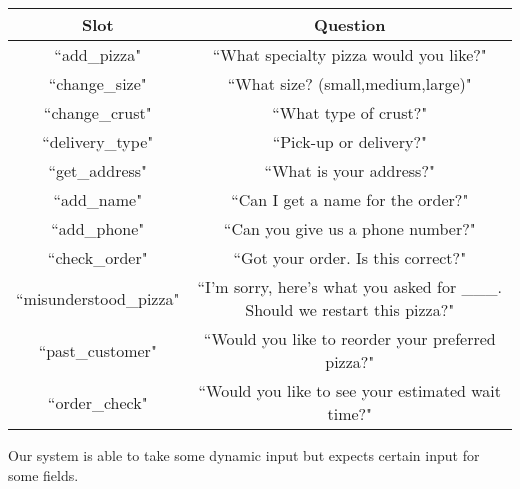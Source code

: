 \documentclass{article}
\begin{document}
\begin{tabular}{|c|c|}
\hline
Slot & Question \\\hline
``add\_pizza" & ``What specialty pizza would you like?"\\\hline
``change\_size" & ``What size? (small,medium,large)"\\\hline
``change\_crust" & ``What type of crust?"\\\hline
``delivery\_type" & ``Pick-up or delivery?"\\\hline
``get\_address" & ``What is your address?"\\\hline
``add\_name" & ``Can I get a name for the order?"\\\hline
``add\_phone" & ``Can you give us a phone number?"\\\hline
``check\_order" & ``Got your order. Is this correct?"\\\hline
``misunderstood\_pizza" & ``I'm sorry, here's what you asked for \_\_\_. Should we restart this pizza?"\\\hline
``past\_customer" & ``Would you like to reorder your preferred pizza?"\\\hline
``order\_check" & ``Would you like to see your estimated wait time?"\\\hline
\end{tabular}

\vspace{.5cm}

Our system is able to take some dynamic input but expects certain input for some fields.
\end{document}
